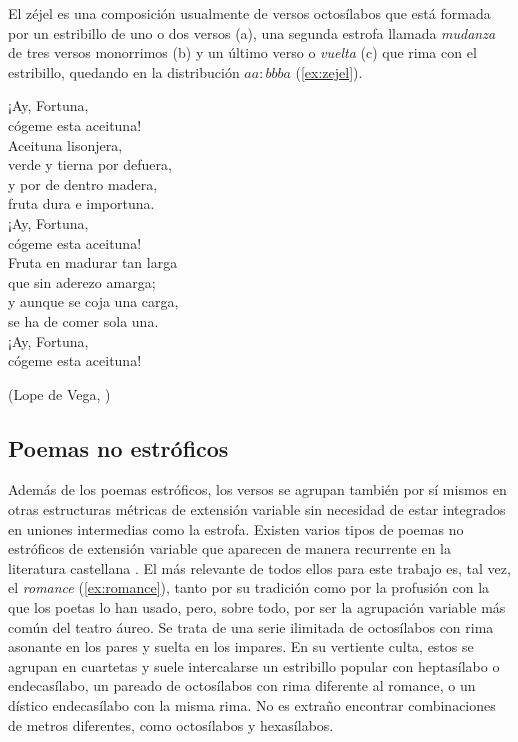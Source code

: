 El {zéjel} es una composición usualmente de versos octosílabos que está formada por un estribillo de uno o dos versos (a), una segunda estrofa llamada \textit{mudanza} de tres versos monorrimos (b) y un último verso o \textit{vuelta} (c) que rima con el estribillo, quedando en la distribución $aa:bbba$ (\ref{ex:zejel}).

\strut\begin{exe}\ex\label{ex:zejel}\begin{multicols}{2}¡Ay, Fortuna,\\
	cógeme esta aceituna!\vspace{.333\baselineskip}\\
	Aceituna lisonjera,\\
	verde y tierna por defuera,\\
	y por de dentro madera,\\
	fruta dura e importuna.\vspace{.333\baselineskip}\\
	¡Ay, Fortuna,\\
	cógeme esta aceituna!\vspace{.333\baselineskip}\\
	Fruta en madurar tan larga\\
	que sin aderezo amarga;\\
	y aunque se coja una carga,\\
	se ha de comer sola una.\vspace{.333\baselineskip}\\
	¡Ay, Fortuna,\\
	cógeme esta aceituna!\end{multicols}
	\strut\hfill(Lope de Vega, )
\end{exe}

\subsection{Poemas no estróficos}
Además de los poemas estróficos, los versos se agrupan también por sí mismos en otras estructuras métricas de extensión variable sin necesidad de estar integrados en uniones intermedias como la estrofa. Existen varios tipos de poemas no estróficos de extensión variable que aparecen de manera recurrente en la literatura castellana \parencites[150-169]{quilis2013}[254]{navarrotomas1991}. El más relevante de todos ellos para este trabajo es, tal vez, el \textit{romance} (\ref{ex:romance}), tanto por su tradición como por la profusión con la que los poetas lo han usado, pero, sobre todo, por ser la agrupación variable más común del teatro áureo. Se trata de una serie ilimitada de octosílabos con rima asonante en los pares y suelta en los impares. En su vertiente culta, estos se agrupan en cuartetas y suele intercalarse un estribillo popular con heptasílabo o endecasílabo, un pareado de octosílabos con rima diferente al romance, o un dístico endecasílabo con la misma rima. No es extraño encontrar combinaciones de metros diferentes, como octosílabos y hexasílabos.

